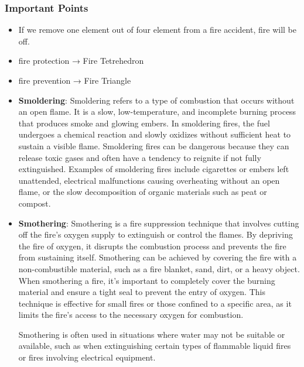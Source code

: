 \documentclass{article}
\begin{document}
\subsubsection*{Important Points}
\begin{itemize}
  \item If we remove one element out of four element from a fire accident, fire will be off. 
  \item fire protection → Fire Tetrehedron 
  \item fire prevention → Fire Triangle 
  \item \textbf{Smoldering}:
  Smoldering refers to a type of combustion that occurs without an open flame. It is a slow, low-temperature, and incomplete burning process that produces smoke and glowing embers. In smoldering fires, the fuel undergoes a chemical reaction and slowly oxidizes without sufficient heat to sustain a visible flame. Smoldering fires can be dangerous because they can release toxic gases and often have a tendency to reignite if not fully extinguished.
  Examples of smoldering fires include cigarettes or embers left unattended, electrical malfunctions causing overheating without an open flame, or the slow decomposition of organic materials such as peat or compost.
  
  \item \textbf{Smothering}:
  Smothering is a fire suppression technique that involves cutting off the fire's oxygen supply to extinguish or control the flames. By depriving the fire of oxygen, it disrupts the combustion process and prevents the fire from sustaining itself. Smothering can be achieved by covering the fire with a non-combustible material, such as a fire blanket, sand, dirt, or a heavy object.
  When smothering a fire, it's important to completely cover the burning material and ensure a tight seal to prevent the entry of oxygen. This technique is effective for small fires or those confined to a specific area, as it limits the fire's access to the necessary oxygen for combustion.
  
  Smothering is often used in situations where water may not be suitable or available, such as when extinguishing certain types of flammable liquid fires or fires involving electrical equipment.
\end{itemize}
\end{document}
